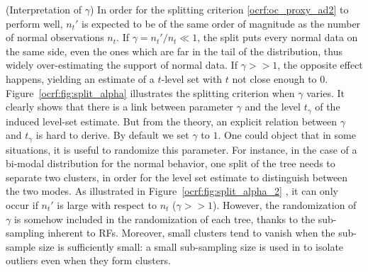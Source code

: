\begin{remark}({\sc Interpretation of $\gamma$})
\label{ocrf:rk:gamma}
In order for the splitting criterion \eqref{ocrf:oc_proxy_ad2} to perform well, $n_t'$ is expected to be of the same order of magnitude as the number of normal observations $n_t$. If $\gamma = n_t'/n_t \ll 1$, the split puts every normal data on the same side, even the ones which are far in the tail of the distribution, thus widely over-estimating the support of normal data. If $\gamma >> 1$, the opposite effect happens, yielding an estimate of a $t$-level set with $t$ not close enough to $0$.
Figure~\ref{ocrf:fig:split_alpha}
 illustrates the splitting criterion when $\gamma$ varies. It clearly shows that there is a link between parameter $\gamma$ and the level $t_\gamma$ of the induced level-set estimate. But from the theory, an explicit relation between $\gamma$ and $t_\gamma$ is hard to derive. By default we set $\gamma$ to $1$.
%
One could object that in some situations, it is useful to randomize this parameter. For instance, in the case of a bi-modal distribution for the normal behavior, one split of the tree needs to separate two clusters, in order for the level set estimate to distinguish between the two modes. As illustrated in Figure~\ref{ocrf:fig:split_alpha_2}
, it can only occur if $n_t'$ is large with respect to $n_t$ ($\gamma >> 1$). However, the randomization of $\gamma$ is somehow included in the randomization of each tree, thanks to the sub-sampling inherent to RFs.
%
Moreover, small clusters tend to vanish when the sub-sample size is sufficiently small: a small sub-sampling size is used in \cite{Liu2008} to isolate outliers even when they form clusters.
\end{remark}





